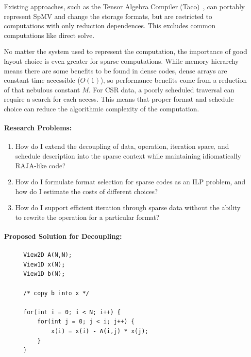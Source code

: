 \documentclass{article}
\begin{document}
Existing approaches, such as the Tensor Algebra Compiler (Taco)~\cite{kjolstad2017tensor}, can portably represent SpMV and change the storage formats, but are restricted to computations with only reduction dependences.
This excludes common computations like direct solve.

No matter the system used to represent the computation, the importance of good layout choice is even greater for sparse computations.
While memory hierarchy means there are some benefits to be found in dense codes, dense arrays are constant time accessible ($O(1)$), so performance benefits come from a reduction of that nebulous constant $M$.
For CSR data, a poorly scheduled traversal can require a search for each access.
This means that proper format and schedule choice can reduce the algorithmic complexity of the computation.


\paragraph{Research Problems:}
\begin{enumerate}[label=Q3.\arabic*]
    \item How do I extend the decoupling of data, operation, iteration space, and schedule description into the sparse context while maintaining idiomatically RAJA-like code?
    \item How do I formulate format selection for sparse codes as an ILP problem, and how do I estimate the costs of different choices?
    \item How do I support efficient iteration through sparse data without the ability to rewrite the operation for a particular format? 
\end{enumerate}


\paragraph{Proposed Solution for Decoupling:}


\begin{figure}
\begin{lstlisting}[label={ForwardSolveC},caption={C-like implementation of forward substitution using Views}]
View2D A(N,N);
View1D x(N);
View1D b(N);

/* copy b into x */

for(int i = 0; i < N; i++) {
    for(int j = 0; j < i; j++) {
        x(i) = x(i) - A(i,j) * x(j);
    }
}
\end{lstlisting}
\end{figure}
\end{document}
